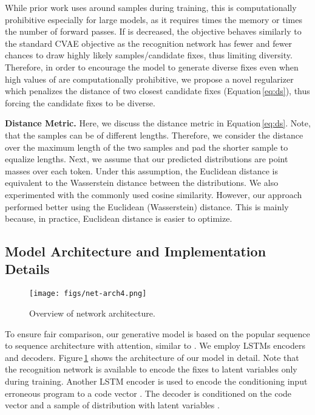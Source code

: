 \documentclass[letterpaper]{article} \usepackage{aaai20}  \usepackage{times}  \usepackage{helvet} \usepackage{courier}  \usepackage[hyphens]{url}  \usepackage{graphicx}
\newcommand{\figref}{Figure}
\newcommand{\equref}{Equation}
\newcommand{\myparagraph}[1]{\vspace{0.0em}\noindent\textbf{#1.}}
\begin{document}
While prior work uses around  samples during training, this is computationally prohibitive especially for large models, as it requires  times the memory or  times the number of forward passes. If  is decreased, the objective behaves similarly to the standard CVAE objective as the recognition network has fewer and fewer chances to draw highly likely samples/candidate fixes, thus limiting diversity. Therefore, in order to encourage the model to generate diverse fixes even when high values of  are computationally prohibitive, we propose a novel regularizer which penalizes the distance of two closest candidate fixes (\equref \,\ref{eq:ds}), thus forcing the candidate fixes to be diverse. 



\myparagraph{Distance Metric}
\label{para:metric}
Here, we discuss the distance metric  in \equref \,\ref{eq:ds}. Note, that the samples  can be of different lengths. Therefore, we consider the distance over the maximum length of the two samples and pad the shorter sample to equalize lengths. Next, we assume that our predicted distributions are point masses over each token. Under this assumption, the Euclidean distance is equivalent to the Wasserstein distance between the distributions. We also experimented with the commonly used cosine similarity. However, our approach performed better using the Euclidean (Wasserstein) distance. This is mainly because, in practice, Euclidean distance is easier to optimize.

\subsection{Model Architecture and Implementation Details}
	

\begin{figure}
\centering
    \texttt{[image: figs/net-arch4.png]}
    \caption{Overview of network architecture.}
\label{fig:net}
\end{figure}


To ensure fair comparison, our generative model is based on the popular sequence to sequence architecture with attention, similar to \cite{Gupta2017DeepFixFC}.  We employ LSTMs encoders and decoders. \figref \,\ref{fig:net} shows the architecture of our model in detail. Note that the recognition network is available to encode the fixes to latent variables  only during training. Another LSTM encoder is used to encode the conditioning input erroneous program  to a code vector . The decoder is conditioned on the code vector  and a sample of distribution with latent variables .
\end{document}
